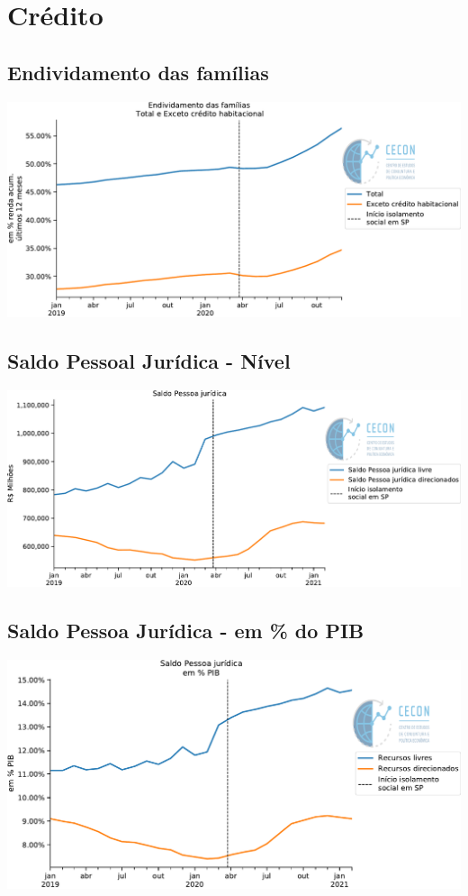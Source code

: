 \documentclass{SelfArx}
\begin{document}
\section*{Crédito}
\label{sec:org0ccbae6}

\subsection*{Endividamento das famílias}
\label{sec:org17591d2}

\begin{center}
\includegraphics[width=.9\linewidth]{./figs/Credito/EndividamentoFamilias.pdf}
\end{center}


\subsection*{Saldo Pessoal Jurídica - Nível}
\label{sec:orga98f5ed}

\begin{center}
\includegraphics[width=.9\linewidth]{./figs/Credito/SaldoPJ.pdf}
\end{center}



\subsection*{Saldo Pessoa Jurídica - em \% do PIB}
\label{sec:orgc021cbe}
\begin{center}
\includegraphics[width=.9\linewidth]{./figs/Credito/SaldoPJ_PIB.pdf}
\end{center}
\end{document}
